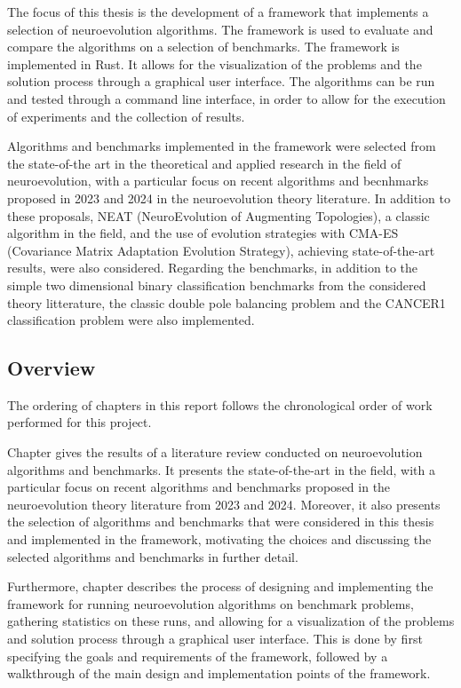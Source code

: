 The focus of this thesis is the development of a framework that implements a selection of neuroevolution algorithms.
The framework is used to evaluate and compare the algorithms on a selection of benchmarks.
The framework is implemented in Rust. It allows for the visualization of the problems and the solution process through a graphical user interface.
The algorithms can be run and tested through a command line interface, in order to allow for the execution of experiments and the collection of results.

Algorithms and benchmarks implemented in the framework were selected from the state-of-the art in the theoretical and applied research in the field of neuroevolution,
with a particular focus on recent algorithms and becnhmarks proposed in 2023 and 2024 in the neuroevolution theory literature.
In addition to these proposals, NEAT (NeuroEvolution of Augmenting Topologies), a classic algorithm in the field, and the use of evolution strategies with CMA-ES
(Covariance Matrix Adaptation Evolution Strategy), achieving state-of-the-art results, were also considered.
Regarding the benchmarks, in addition to the simple two dimensional binary classification benchmarks from the considered theory litterature, the
classic double pole balancing problem and the CANCER1 classification problem were also implemented.

\subsection{Overview}

The ordering of chapters in this report follows the chronological order of work performed for this project.

Chapter  gives the results of a literature review conducted on neuroevolution algorithms and benchmarks. It presents the state-of-the-art in the field,
with a particular focus on recent algorithms and benchmarks proposed in the neuroevolution theory literature from 2023 and 2024.
Moreover, it also presents the selection of algorithms and benchmarks that were considered in this thesis and implemented in the framework, motivating the choices and
discussing the selected algorithms and benchmarks in further detail.

Furthermore, chapter  describes the process of designing and implementing the framework for running neuroevolution algorithms on benchmark problems,
gathering statistics on these runs, and allowing for a visualization of the problems and solution process through a graphical user interface. This is done by first
specifying the goals and requirements of the framework, followed by a walkthrough of the main design and implementation points of the framework.

